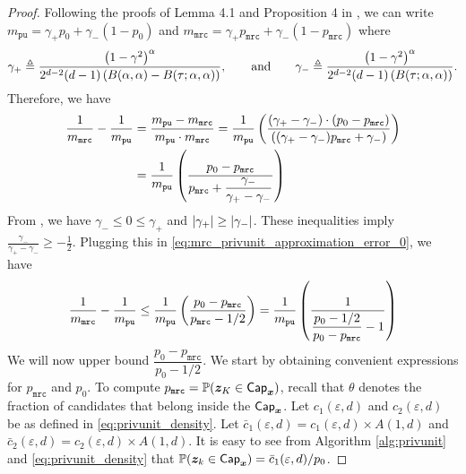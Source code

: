 \begin{proof}
Following the proofs of Lemma 4.1 and Proposition 4 in \cite{BDFKR2018}, we can write $m_{\texttt{pu}} = \gamma_+ p_0 + \gamma_-(1-p_0)$ and $m_\texttt{mrc} = \gamma_+ p_{\texttt{mrc}} + \gamma_-(1-p_{\texttt{mrc}})$ where
\begin{align}
    \gamma_+ \triangleq \frac{\left( 1-\gamma^2\right)^\alpha}{2^{d-2}(d-1)\left( B(\alpha, \alpha)-B(\tau; \alpha, \alpha) \right)}, \qquad \mathrm{and} \qquad 
    \gamma_- \triangleq \frac{\left( 1-\gamma^2\right)^\alpha}{2^{d-2}(d-1)\left( B(\tau; \alpha, \alpha) \right)}.
\end{align}
Therefore, we have
\begin{align}
  \frac{1}{m_\texttt{mrc}} - \frac{1}{m_{\texttt{pu}}} & =
  \frac{m_{\texttt{pu}}-m_\texttt{mrc}}{m_{\texttt{pu}} \cdot m_\texttt{mrc}} = \frac{1}{m_{\texttt{pu}}} \left( \frac{(\gamma_+-\gamma_-) \cdot \left( p_0 - p_{\texttt{mrc}} \right)}{\left( (\gamma_+ - \gamma_-) p_{\texttt{mrc}}+\gamma_-\right)} \right) \\
  & = \frac{1}{m_{\texttt{pu}}}\left(\frac{ p_0 - p_{\texttt{mrc}} }{ p_{\texttt{mrc}} +\dfrac{\gamma_-}{\gamma_+-\gamma_-}}\right) \label{eq:mrc_privunit_approximation_error_0}
\end{align}
From \cite{BDFKR2018}, we have $\gamma_- \leq 0 \leq \gamma_+$ and $\left\lvert \gamma_+ \right\rvert \geq \left\lvert \gamma_- \right\rvert$. These inequalities imply $\frac{\gamma_-}{\gamma_+-\gamma_-} \geq -\frac{1}{2}$. Plugging this in \eqref{eq:mrc_privunit_approximation_error_0}, we have
\begin{align}
    \frac{1}{m_\texttt{mrc}} - \frac{1}{m_{\texttt{pu}}} \leq \frac{1}{m_{\texttt{pu}}}\left(\frac{ p_0 - p_{\texttt{mrc}} }{ p_{\texttt{mrc}} - 1/2}\right) = \frac{1}{m_{\texttt{pu}}}\left(\frac{ 1 }{ \dfrac{p_0 - 1/2}{p_0 - p_{\texttt{mrc}}}-1}\right)
    \label{eq:mrc_privunit_approximation_error_1}
\end{align}
We will now upper bound $\dfrac{p_0 - p_{\texttt{mrc}}}{p_0 - 1/2}$. We start by obtaining convenient expressions for $p_{\texttt{mrc}}$ and $p_0$. To compute $p_{\texttt{mrc}} = \mathbb{P}({\boldsymbol{z}}_K \in \mathsf{Cap}_{{\boldsymbol{x}}})$, recall that $\theta$ denotes the fraction of candidates that belong inside the $\mathsf{Cap}_{{\boldsymbol{x}}}$. Let $c_1(\varepsilon, d)$ and $c_2(\varepsilon, d)$ be as defined in \eqref{eq:privunit_density}. Let $\bar{c}_1(\varepsilon, d) = c_1(\varepsilon, d) \times A(1,d)$ and $\bar{c}_2(\varepsilon, d) = c_2(\varepsilon, d) \times A(1,d)$. It is easy to see from Algorithm \ref{alg:privunit} and \eqref{eq:privunit_density} that $\mathbb{P}({\boldsymbol{z}}_k \in \mathsf{Cap}_{{\boldsymbol{x}}}) =  \bar{c}_1(\varepsilon, d) / p_0$. 

\end{proof}

